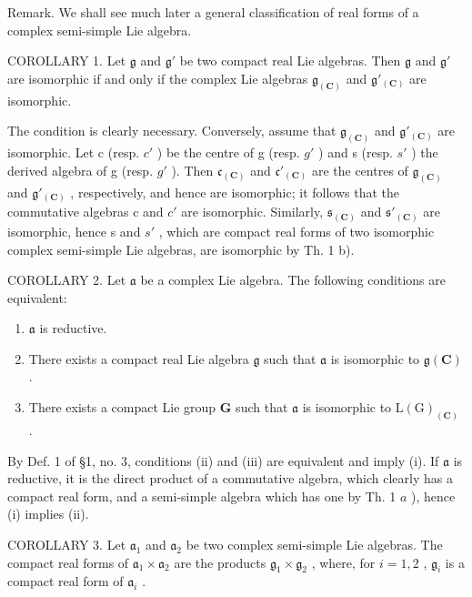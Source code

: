 Remark. We shall see much later a general classification of real forms of a complex semi-simple Lie algebra.

COROLLARY 1. Let \(\mathfrak{g}\) and \(\mathfrak{g}'\) be two compact real Lie algebras. Then \(\mathfrak{g}\) and \(\mathfrak{g}'\) are isomorphic if and only if the complex Lie algebras \(\mathfrak{g}_{(\mathbf{C})}\) and \(\mathfrak{g}'_{(\mathbf{C})}\) are isomorphic.

The condition is clearly necessary. Conversely, assume that \(\mathfrak{g}_{(\mathbf{C})}\) and \(\mathfrak{g}'_{(\mathbf{C})}\) are isomorphic. Let c (resp. \(c'\) ) be the centre of g (resp. \(g'\) ) and s (resp. \(s'\) ) the derived algebra of g (resp. \(g'\) ). Then \(\mathfrak{c}_{(\mathbf{C})}\) and \(\mathfrak{c}'_{(\mathbf{C})}\) are the centres of \(\mathfrak{g}_{(\mathbf{C})}\) and \(\mathfrak{g}'_{(\mathbf{C})}\) , respectively, and hence are isomorphic; it follows that the commutative algebras c and \(c'\) are isomorphic. Similarly, \(\mathfrak{s}_{(\mathbf{C})}\) and \(\mathfrak{s}'_{(\mathbf{C})}\) are isomorphic, hence s and \(s'\) , which are compact real forms of two isomorphic complex semi-simple Lie algebras, are isomorphic by Th. 1 b).

COROLLARY 2. Let \(\mathfrak{a}\) be a complex Lie algebra. The following conditions are equivalent:

\begin{enumerate}
\def\labelenumi{(\roman{enumi})}
\item
  \(\mathfrak{a}\) is reductive.
\item
  There exists a compact real Lie algebra \(\mathfrak{g}\) such that \(\mathfrak{a}\) is isomorphic to \(\mathfrak{g}(\mathbf{C})\) .
\item
  There exists a compact Lie group \(\mathbf{G}\) such that \(\mathfrak{a}\) is isomorphic to \(\mathrm{L}(\mathrm{G})_{(\mathbf{C})}\) .
\end{enumerate}

By Def. 1 of §1, no. 3, conditions (ii) and (iii) are equivalent and imply (i). If \(\mathfrak{a}\) is reductive, it is the direct product of a commutative algebra, which clearly has a compact real form, and a semi-simple algebra which has one by Th. 1 \(a\) ), hence (i) implies (ii).

COROLLARY 3. Let \(\mathfrak{a}_1\) and \(\mathfrak{a}_2\) be two complex semi-simple Lie algebras. The compact real forms of \(\mathfrak{a}_1 \times \mathfrak{a}_2\) are the products \(\mathfrak{g}_1 \times \mathfrak{g}_2\) , where, for \(i = 1, 2\) , \(\mathfrak{g}_i\) is a compact real form of \(\mathfrak{a}_i\) .

